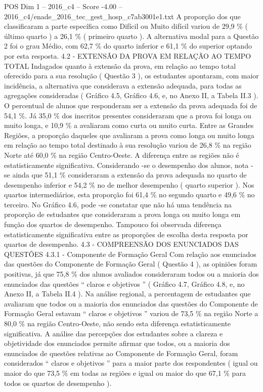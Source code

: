 \begin{textsample}{POS Dim 1 – 2016\_c4 – Score -4.00 – 2016\_c4/enade\_2016\_tec\_gest\_hosp\_c7ab3001e1.txt}
A proporção dos que classificaram a parte específica como Difícil ou Muito difícil variou de 29,9 \% ( último quarto ) a 26,1 \% ( primeiro quarto ).
A alternativa modal para a Questão 2 foi o grau Médio, com 62,7 \% do quarto inferior e 61,1 \% do superior optando por esta resposta. 4.2 - EXTENSÃO DA PROVA EM RELAÇÃO AO TEMPO TOTAL Indagados quanto à extensão da prova, em relação ao tempo total oferecido para a sua resolução ( Questão 3 ), os estudantes apontaram, com maior incidência, a alternativa que considerava a extensão adequada, para todas as agregações consideradas ( Gráfico 4.5, Gráfico 4.6, e, no Anexo II, a Tabela II.3 ).
O percentual de alunos que responderam ser a extensão da prova adequada foi de 54,1 \%.
Já 35,0 \% dos inscritos presentes consideraram que a prova foi longa ou muito longa, e 10,9 \% a avaliaram como curta ou muito curta.
Entre as Grandes Regiões, a proporção daqueles que avaliaram a prova como longa ou muito longa em relação ao tempo total destinado à sua resolução variou de 26,8 \% na região Norte até 60,0 \% na região Centro-Oeste.
A diferença entre as regiões não é estatisticamente significativa.
Considerando -se o desempenho dos alunos, nota -se ainda que 51,1 \% consideraram a extensão da prova adequada no quarto de desempenho inferior e 54,2 \% no de melhor desempenho ( quarto superior ).
Nos quartos intermediários, esta proporção foi 61,4 \% no segundo quarto e 49,6 \% no terceiro.
No Gráfico 4.6, pode -se constatar que não há uma tendência na proporção de estudantes que consideraram a prova longa ou muito longa em função dos quartos de desempenho.
Tampouco foi observada diferença estatisticamente significativa entre as proporções de escolha desta resposta por quartos de desempenho. 4.3 - COMPREENSÃO DOS ENUNCIADOS DAS QUESTÕES 4.3.1 - Componente de Formação Geral Com relação aos enunciados das questões do Componente de Formação Geral ( Questão 4 ), as opiniões foram positivas, já que 75,8 \% dos alunos avaliados consideraram todos ou a maioria dos enunciados das questões “ claros e objetivos ” ( Gráfico 4.7, Gráfico 4.8, e, no Anexo II, a Tabela II.4 ).
Na análise regional, a percentagem de estudantes que avaliaram que todos ou a maioria dos enunciados das questões do Componente de Formação Geral estavam “ claros e objetivos ” variou de 73,5 \% na região Norte a 80,0 \% na região Centro-Oeste, não sendo esta diferença estatisticamente significativa.
A análise das percepções dos estudantes sobre a clareza e objetividade dos enunciados permite afirmar que todos, ou a maioria dos enunciados de questões relativas ao Componente de Formação Geral, foram considerados “ claros e objetivos ” para a maior parte dos respondentes ( igual ou maior do que 73,5 \% em todas as regiões e igual ou maior do que 67,1 \% para todos os quartos de desempenho ).

\end{textsample}
